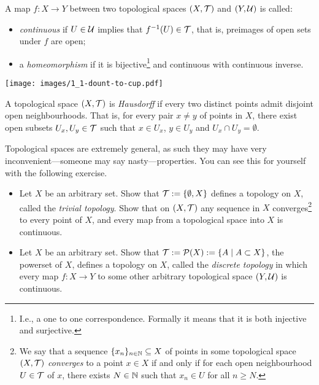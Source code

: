 \begin{definition}
  A map $f: X \to Y$ between two topological spaces $(X,\mathcal{T})$ and $(Y, \mathcal{U})$ is called:
  \begin{itemize}
    \item \emph{continuous} if $U\in\mathcal{U}$ implies that $f^{-1}(U)\in\mathcal{T}$, that is, preimages of open sets under $f$ are open;
    \item  a \emph{homeomorphism} if it is bijective\footnote{I.e., a one to one correspondence. Formally it means that it is both injective and surjective.} and continuous with continuous inverse.
  \end{itemize}
\end{definition}

\begin{marginfigure}
  \texttt{[image: images/1\_1-dount-to-cup.pdf]}
  \vspace{5pt}
\end{marginfigure}

\begin{definition}
  A topological space $(X, \mathcal{T})$ is \emph{Hausdorff} if every two distinct points admit disjoint open neighbourhoods. That is, for every pair $x\neq y$ of points in $X$, there exist open subsets $U_x, U_y\in\mathcal{T}$ such that $x\in U_x$, $y\in U_y$ and $U_x \cap U_y = \emptyset$.
\end{definition}

Topological spaces are extremely general, as such they may have very inconvenient---someone may say nasty---properties.
You can see this for yourself with the following exercise.

\begin{exercise}
  \begin{itemize}
    \item Let $X$ be an arbitrary set. Show that $\mathcal{T}:=\{\emptyset, X\}$ defines a topology on $X$, called the \emph{trivial topology}. Show that on $(X, \mathcal{T})$ any sequence in $X$ converges\footnote{We say that a sequence $\{x_n\}_{n\in\mathbb{N}}\subseteq X$ of points in some topological space $(X, \mathcal{T})$ \emph{converges} to a point $x\in X$ if and only if for each open neighbourhood $U\in\mathcal{T}$ of $x$, there exists $N\in\mathbb{N}$ such that $x_n\in U$ for all $n\geq N$.} to every point of $X$, and every map from a topological space into $X$ is continuous.
    \item Let $X$ be an arbitrary set. Show that $\mathcal{T}:=\mathcal{P}(X) := \{ A \mid A\subset X \}$, the powerset of $X$, defines a topology on $X$, called the \emph{discrete topology} in which every map $f : X \to Y$ to some other arbitrary topological space $(Y, \mathcal{U})$ is continuous.
  \end{itemize}
\end{exercise}

